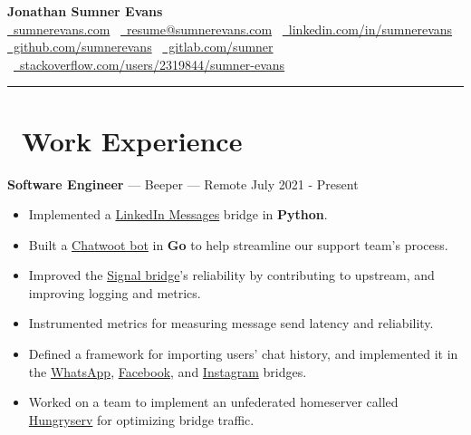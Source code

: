 \documentclass[10pt,letterpaper]{article}
\begin{document}
\begin{center}
    {\huge\textbf{Jonathan Sumner Evans}} \\
    \vspace{3pt}
    \href{https://sumnerevans.com}{\faGlobe\ sumnerevans.com}
    \textbar\ \href{mailto:resume@sumnerevans.com}{\faEnvelope\ resume@sumnerevans.com}
    \textbar\ \href{https://www.linkedin.com/in/sumnerevans}{\faLinkedin\ linkedin.com/in/sumnerevans} \\
    \href{https://github.com/sumnerevans}{\faGithub\ github.com/sumnerevans}
    \textbar\ \href{https://gitlab.com/sumner}{\faGitlab\ gitlab.com/sumner}
    \textbar\ \href{https://stackoverflow.com/users/2319844/sumner-evans}{\faStackOverflow\ stackoverflow.com/users/2319844/sumner-evans}
    \rule{\textwidth}{0.5pt}
\end{center}

\section*{\faBriefcase\ Work Experience}
\textbf{Software Engineer} --- Beeper --- Remote
\hfill July 2021 - Present
\begin{itemize}
    \item Implemented a \href{https://gitlab.com/beeper/linkedin}{LinkedIn
        Messages} bridge in \textbf{Python}.
    \item Built a \href{https://gitlab.com/beeper/chatwoot}{Chatwoot bot} in
        \textbf{Go} to help streamline our support team's process.
    \item Improved the \href{https://github.com/mautrix/signal}{Signal
        bridge}'s reliability by contributing to upstream, and improving logging
        and metrics.
    \item Instrumented metrics for measuring message send latency and
        reliability.
    \item Defined a framework for importing users' chat history, and
        implemented it in the
        \href{https://github.com/mautrix/whatsapp}{WhatsApp},
        \href{https://github.com/mautrix/facebook}{Facebook}, and
        \href{https://github.com/mautrix/instagram}{Instagram} bridges.
    \item Worked on a team to implement an unfederated homeserver called
        \href{https://gitlab.com/beeper/hungryserv}{Hungryserv} for optimizing
        bridge traffic.
\end{itemize}
\end{document}
